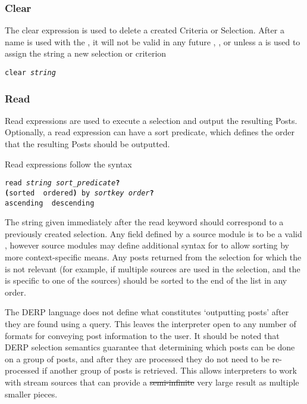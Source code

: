 \subsubsection{Clear}
The clear expression is used to delete a created Criteria or Selection. After a name is used with the
, it will not be valid in any future , , or 
unless a  is used to assign the string a new selection or criterion
\begin{description}[labelindent=1cm,leftmargin=\onelen,labelwidth=1cm]
     \texttt{clear \textit{string}}\\
\end{description}

\subsubsection{Read}
Read expressions are used to execute a selection and output the resulting Posts. Optionally, a read
expression can have a sort predicate, which defines the order that the resulting Posts should be outputted.

Read expressions follow the syntax
\begin{description}[labelindent=1cm,leftmargin=\onelen,labelwidth=1cm]
      \texttt{read \textit{string} \textit{sort\_predicate}\textbf{?}}\\
      \texttt{\textbf{(}sorted \textbf{\textbar} ordered\textbf{)} by \textit{sortkey order}\textbf{?}}\\
      \texttt{ascending \textbf{\textbar} descending}\\
\end{description}

The string given immediately after the read keyword should correspond to a previously created selection.
Any field defined by a source module is to be a valid , however source modules may define additional
syntax for  to allow sorting by more context-specific means. Any posts returned from the selection
for which the  is not relevant (for example, if multiple sources are used in the selection, and the
 is specific to one of the sources) should be sorted to the end of the list in any order.

The DERP language does not define what constitutes ‘outputting posts’ after they are found using a query.
This leaves the interpreter open to any number of formats for conveying post information to the user.
It should be noted that DERP selection semantics guarantee that determining which posts can be done on a
group of posts, and after they are processed they do not need to be re-processed if another group of posts
is retrieved. This allows interpreters to work with stream sources that can provide a \st{semi-infinite} very
large result as multiple smaller pieces.

